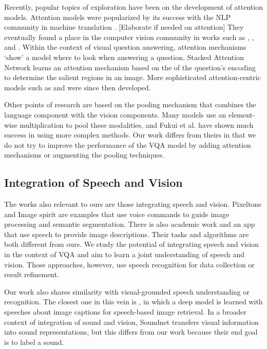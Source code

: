 \documentclass[letterpaper]{article} %
\begin{document}
Recently, popular topics of exploration have been on the development of attention models. Attention models were popularized by its success with the NLP community in machine translation . [Elaborate if needed on attention] They eventually found a place in the computer vision community in works such as , , and . Within the context of visual question answering, attention mechanisms `show' a model where to look when answering a question. Stacked Attention Network  learns an attention mechanism based on the of the question's encoding to determine the salient regions in an image. More sophisticated attention-centric models such as  and  were since then developed.

Other points of research are based on the pooling mechanism that combines the language component with the vision components. Many models    use an element-wise multiplication to pool these modalities,  and Fukui et al.  have shown much success in using more complex methods. Our work differs from theirs in that we do not try to improve the performance of the VQA model by adding attention mechanisms or augmenting the pooling techniques.


\subsection{Integration of Speech and Vision}
The works also relevant to ours are those integrating speech and vision. Pixeltone 
and Image spirit  are examples that use voice
commands to guide image processing and semantic segmentation. There is also academic work    and an app  that use speech to provide image descriptions. Their tasks and algorithms are both different from ours. We study the potential of integrating speech and vision in the context of VQA and aim to learn a joint understanding of speech and vision. Those approaches, however, use speech recognition for data collection or result refinement.

Our work also shares similarity with visual-grounded speech understanding or recognition. The closest one in this vein is , in which a deep model is learned with speeches about image captions for speech-based image retrieval. In a broader context of integration of sound and vision, Soundnet  transfers visual information into sound representations, but this differs from our work because their end goal is to label a sound.
\end{document}

